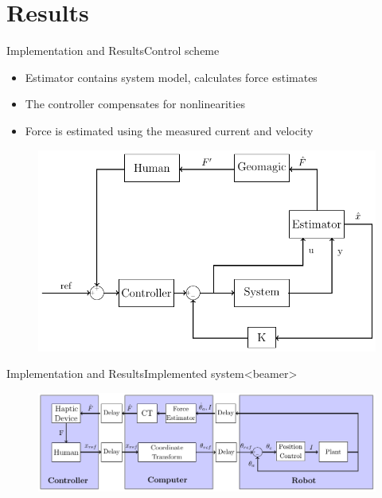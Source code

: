 \section{Results}

\begin{frame}{Implementation and Results}{Control scheme}
  \begin{itemize}
    \item Estimator contains system model, calculates force estimates
    \item The controller compensates for nonlinearities
    \item Force is estimated using the measured current and velocity
    \end{itemize}
	\begin{figure}
	\centering
	\includegraphics[scale=0.7]{Billeder/kalman_control}
	\end{figure}
\end{frame}

\begin{frame}{Implementation and Results}{Implemented system}<beamer>

\begin{figure}
	\centering
	\includegraphics[scale=0.7]{Billeder/simple_control}
\end{figure}
\end{frame}

